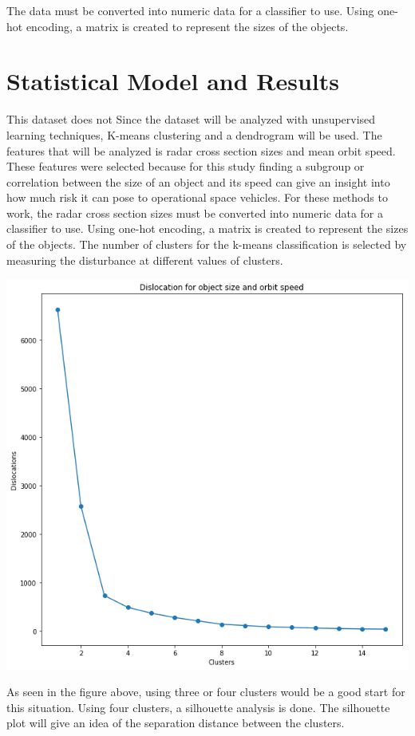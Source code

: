 \documentclass[12pt,a4paper]{article}
\begin{document}
The data must be converted into numeric data for a classifier to use. Using one-hot encoding, a matrix is created to represent the sizes of the objects.

\section{Statistical Model and Results}
This dataset does not 
Since the dataset will be analyzed with unsupervised learning techniques, K-means clustering and a dendrogram will be used. The features that will be analyzed is radar cross section sizes and mean orbit speed. These features were selected because for this study finding a subgroup or correlation between the size of an object and its speed can give an insight into how much risk it can pose to operational space vehicles.   For these methods to work, the radar cross section sizes must be converted into numeric data for a classifier to use. Using one-hot encoding, a matrix is created to represent the sizes of the objects.  The number of clusters for the k-means classification is selected by measuring the disturbance at different values of clusters.
\begin{center}
	\includegraphics[scale=0.25]{figures/dislocation_obj_size.png}
	\label{fig:Dislocation}
\end{center}
As seen in the figure above, using three or four clusters would be a good start for this situation. Using four clusters, a silhouette analysis is done. The silhouette plot will give an idea of the separation distance between the clusters.
\end{document}
